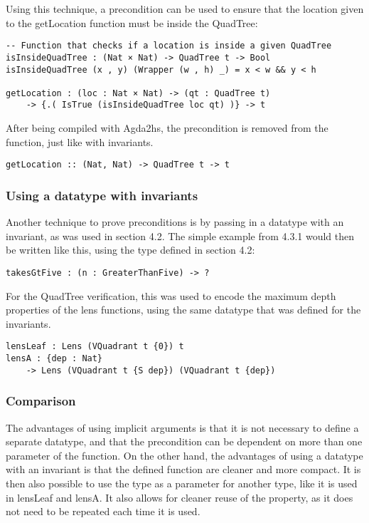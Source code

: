 Using this technique, a precondition can be used to ensure that the location given to the getLocation function must be inside the QuadTree:
\begin{verbatim}
-- Function that checks if a location is inside a given QuadTree
isInsideQuadTree : (Nat × Nat) -> QuadTree t -> Bool
isInsideQuadTree (x , y) (Wrapper (w , h) _) = x < w && y < h

getLocation : (loc : Nat × Nat) -> (qt : QuadTree t) 
    -> {.( IsTrue (isInsideQuadTree loc qt) )} -> t
\end{verbatim}
After being compiled with Agda2hs, the precondition is removed from the function, just like with invariants.
\begin{verbatim}
getLocation :: (Nat, Nat) -> QuadTree t -> t
\end{verbatim}

\subsubsection{Using a datatype with invariants}
Another technique to prove preconditions is by passing in a datatype with an invariant, as was used in section 4.2. The simple example from 4.3.1 would then be written like this, using the type defined in section 4.2:
\begin{verbatim}
takesGtFive : (n : GreaterThanFive) -> ?
\end{verbatim}

For the QuadTree verification, this was used to encode the maximum depth properties of the lens functions, using the same datatype that was defined for the invariants.
\begin{verbatim}
lensLeaf : Lens (VQuadrant t {0}) t
lensA : {dep : Nat} 
    -> Lens (VQuadrant t {S dep}) (VQuadrant t {dep})
\end{verbatim}

\subsubsection{Comparison}
The advantages of using implicit arguments is that it is not necessary to define a separate datatype, and that the precondition can be dependent on more than one parameter of the function. On the other hand, the advantages of using a datatype with an invariant is that the defined function are cleaner and more compact. It is then also possible to use the type as a parameter for another type, like it is used in lensLeaf and lensA. It also allows for cleaner reuse of the property, as it does not need to be repeated each time it is used.

